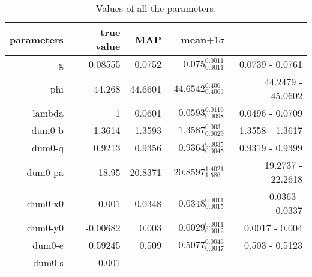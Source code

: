 \begin{table*}\caption{Values of all the parameters.}\begin{center}\begin{tabular}{ r r r r r} parameters & true value & MAP & mean$\pm 1 \sigma$ \\ 
\hline  g & 0.08555 & 0.0752 & $0.075_{0.0011}^{0.0011}$ & 0.0739 - 0.0761 \\ 
 phi & 44.268 & 44.6601 & $44.6542_{0.4063}^{0.406}$ & 44.2479 - 45.0602 \\ 
\hline lambda & 1 & 0.0601 & $0.0593_{0.0098}^{0.0116}$ & 0.0496 - 0.0709 \\ 
\hline dum0-b & 1.3614 & 1.3593 & $1.3587_{0.0029}^{0.003}$ & 1.3558 - 1.3617 \\ 
 dum0-q & 0.9213 & 0.9356 & $0.9364_{0.0045}^{0.0035}$ & 0.9319 - 0.9399 \\ 
 dum0-pa & 18.95 & 20.8371 & $20.8597_{1.586}^{1.4021}$ & 19.2737 - 22.2618 \\ 
 dum0-x0 & 0.001 & -0.0348 & $-0.0348_{0.0015}^{0.0011}$ & -0.0363 - -0.0337 \\ 
 dum0-y0 & -0.00682 & 0.003 & $0.0029_{0.0012}^{0.0011}$ & 0.0017 - 0.004 \\ 
 dum0-e & 0.59245 & 0.509 & $0.5077_{0.0047}^{0.0046}$ & 0.503 - 0.5123 \\ 
 dum0-s & 0.001 & - & - & - \\ 
\hline\end{tabular}\end{center}\label{tab:1}\end{table*}